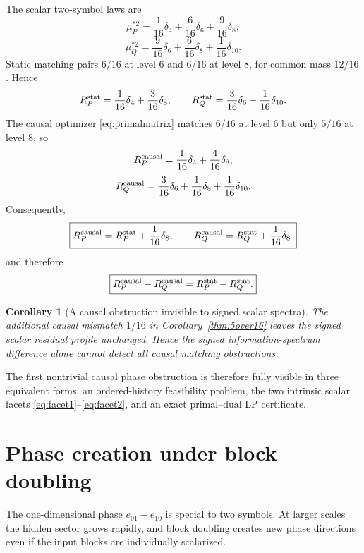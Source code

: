 \documentclass[11pt,a4paper]{article}
\newtheorem{corollary}[theorem]{Corollary}
\theoremstyle{definition}
\theoremstyle{remark}
\begin{document}
The scalar two-symbol laws are
\begin{equation}
 \mu_P^{*2}=\frac1{16}\delta_4+\frac6{16}\delta_6+\frac9{16}\delta_8,
 \label{eq:P2}
\end{equation}
\begin{equation}
 \mu_Q^{*2}=\frac9{16}\delta_6+\frac6{16}\delta_8+\frac1{16}\delta_{10}.
 \label{eq:Q2}
\end{equation}
Static matching pairs \(6/16\) at level \(6\) and \(6/16\) at level \(8\),
for common mass \(12/16\).  Hence
\[
 R_P^{\rm stat}=\frac1{16}\delta_4+\frac3{16}\delta_8,
 \qquad
 R_Q^{\rm stat}=\frac3{16}\delta_6+\frac1{16}\delta_{10}.
\]
The causal optimizer \eqref{eq:primalmatrix} matches \(6/16\) at level \(6\)
but only \(5/16\) at level \(8\), so
\[
 R_P^{\rm causal}=\frac1{16}\delta_4+\frac4{16}\delta_8,
\]
\[
 R_Q^{\rm causal}=\frac3{16}\delta_6+\frac1{16}\delta_8
 +\frac1{16}\delta_{10}.
\]
Consequently,
\begin{equation}
 \boxed{
 R_P^{\rm causal}=R_P^{\rm stat}+\frac1{16}\delta_8,
 \qquad
 R_Q^{\rm causal}=R_Q^{\rm stat}+\frac1{16}\delta_8.}
 \label{eq:hiddenres}
\end{equation}
and therefore
\begin{equation}
 \boxed{
 R_P^{\rm causal}-R_Q^{\rm causal}
 =R_P^{\rm stat}-R_Q^{\rm stat}.}
 \label{eq:sameSigned}
\end{equation}

\begin{corollary}[A causal obstruction invisible to signed scalar spectra]
The additional causal mismatch \(1/16\) in Corollary~\ref{thm:5over16}
leaves the signed scalar residual profile unchanged.  Hence the signed
information-spectrum difference alone cannot detect all causal matching
obstructions.
\end{corollary}

The first nontrivial causal phase obstruction is therefore fully visible in
three equivalent forms: an ordered-history feasibility problem, the two
intrinsic scalar facets \eqref{eq:facet1}--\eqref{eq:facet2}, and an exact
primal--dual LP certificate.

\section{Phase creation under block doubling}
\label{sec:doublingphase}

The one-dimensional phase \(e_{01}-e_{10}\) is special to two symbols.  At
larger scales the hidden sector grows rapidly, and block doubling creates new
phase directions even if the input blocks are individually scalarized.
\end{document}
